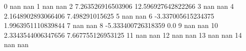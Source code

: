 0 nan nan
1 nan nan
2 7.263526916503906 12.596927642822266
3 nan nan
4 2.1648902893066406 7.498291015625
5 nan nan
6 -3.337005615234375 1.9963951110839844
7 nan nan
8 -5.333400726318359 0.0
9 nan nan
10 2.3343544006347656 7.667755126953125
11 nan nan
12 nan nan
13 nan nan
14 nan nan

